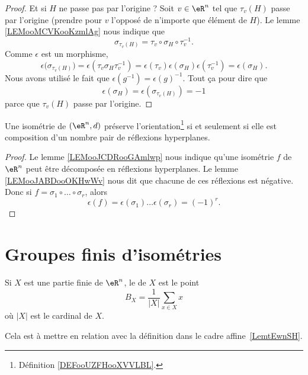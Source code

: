 \begin{proof}
	Et si \( H\) ne passe pas par l'origine ? Soit \( v\in \eR^n\) tel que \( \tau_v(H)\) passe par l'origine (prendre pour \( v\) l'opposé de n'importe que élément de \( H\)). Le lemme \ref{LEMooMCVKooKzmlAg} nous indique que
	\begin{equation}
		\sigma_{\tau_v(H)}=\tau_v\circ \sigma_H\circ \tau_v^{-1}.
	\end{equation}
	Comme \( \epsilon\) est un morphisme,
	\begin{equation}
		\epsilon\big( \sigma_{\tau_v(H)} \big)=\epsilon(\tau_v\sigma_H\tau_v^{-1})=\epsilon(\tau_v)\epsilon(\sigma_H)\epsilon(\tau_v^{-1})=\epsilon(\sigma_H).
	\end{equation}
	Nous avons utilisé le fait que \( \epsilon(g^{-1})=\epsilon(g)^{-1}\). Tout ça pour dire que
	\begin{equation}
		\epsilon(\sigma_H)=\epsilon(\sigma_{\tau_v(H)})=-1
	\end{equation}
	parce que \( \tau_v(H)\) passe par l'origine.
\end{proof}

\begin{theorem}      \label{THOooQEWRooYeOIfZ}
	Une isométrie de \( (\eR^n,d)\) préserve l'orientation\footnote{Définition \ref{DEFooUZFHooXVVLBL}.} si et seulement si elle est composition d'un nombre pair de réflexions hyperplanes.
\end{theorem}

\begin{proof}
	Le lemme \ref{LEMooJCDRooGAmlwp} nous indique qu'une isométrie \( f\) de \( \eR^n\) peut être décomposée en réflexions hyperplanes. Le lemme \ref{LEMooJABDooOKHwWv} nous dit que chacune de ces réflexions est négative. Donc si \( f=\sigma_1\circ\ldots\circ \sigma_r\), alors
	\begin{equation}
		\epsilon(f)=\epsilon(\sigma_1)\ldots \epsilon(\sigma_r)=(-1)^r.
	\end{equation}
\end{proof}


\section{Groupes finis d'isométries}

\begin{definition}      \label{DEFooCUYLooAlbtzv}
	Si \( X\) est une partie finie de \( \eR^n\), le  de \( X\) est le point
	\begin{equation}
		B_X=\frac{1}{ | X | }\sum_{x\in X}x
	\end{equation}
	où \( | X |\) est le cardinal de \( X\).
\end{definition}
Cela est à mettre en relation avec la définition dans le cadre affine~\ref{LemtEwnSH}.

